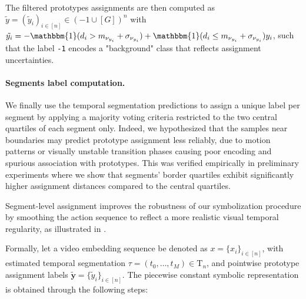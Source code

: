     The filtered prototypes assignments are then computed as $\tilde{y} = (\tilde{y}_i)_{i \in [n]} \in ({-1}\cup[G])^n$ with $\tilde{y_i} = -\mathbbm{1}(d_i > m_{\nu_{y_i}}+ \sigma_{\nu_{y_i}} ) + \mathbbm{1}(d_i \leq m_{\nu_{y_i}} +  \sigma_{\nu_{y_i}} ) y_i$, such that the label \texttt{-1} encodes a "background" class that reflects assignment uncertainties.
    

    \paragraph{Segments label computation.\\}

        We finally use the temporal segmentation predictions to assign a unique label per segment by applying a majority voting criteria restricted to the two central quartiles of each segment only. Indeed, we hypothesized that the samples near boundaries may predict prototype assignment less reliably, due to motion patterns or visually unstable transition phases causing poor encoding and spurious association with prototypes. This was verified empirically in preliminary experiments where we show that segments' border quartiles exhibit significantly higher assignment distances compared to the central quartiles.
        
        Segment-level assignment improves the robustness of our symbolization procedure by smoothing the action sequence to reflect a more realistic visual temporal regularity, as illustrated in . 

        Formally, let a video embedding sequence be denoted as  $x = \{x_i\}_{i \in [n]}$, with estimated temporal segmentation $\tau = (t_0, \ldots, t_M) \in \mathrm{T}_n$, and pointwise prototype assignment labels $\tilde{\mathbf{y}} = \{\tilde{y}_i\}_{i \in [n]}$. The piecewise constant symbolic representation is obtained through the following steps:

